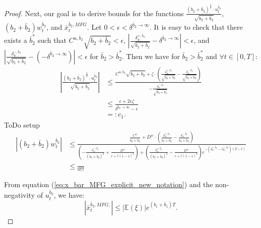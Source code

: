 \documentclass[11pt]{article}
\begin{document}
\begin{proof}
	Next, our goal is to derive bounds for the functions $\frac{(b_2 + \bar{b}_2)^{\frac{3}{2}}\cdot u^{\bar{b}_2}_t}{\sqrt{b_2+\bar{b}_2}}$, $(b_2 + \bar{b}_2) w^{\bar{b}_2}_t$, and $\bar{x}_t^{\bar{b}_2,MFG}$. Let $0<\epsilon<\delta^{\bar{b}_2 \to \infty}$. It is easy to check that there exists a $\bar{b}_2^*$ such that $ C^{u,\bar{b}_2}\sqrt{b_2 + \bar{b}_2} <\epsilon$, $\left| \frac{\delta^{+,\bar{b}_2}_u}{\sqrt{b_2 + \bar{b}_2}}-\delta^{\bar{b}_2 \to \infty}\right|< \epsilon$, and $\left| \frac{\delta^{-,\bar{b}_2}_u}{\sqrt{b_2 + \bar{b}_2}}-(-\delta^{\bar{b}_2 \to \infty})\right|< \epsilon$ for $\bar{b}_2>\bar{b}_2^*$. Then we have for $\bar{b}_2>\bar{b}^*_2$ and $\forall t\in[0,T]$:
		\begin{equation*}
		\begin{split}
		\left| \frac{(b_2 + \bar{b}_2)^{\frac{3}{2}}\cdot u^{\bar{b}_2}_t}{\sqrt{b_2+\bar{b}_2}} \right| &\leq \frac{
			C^{u,\bar{b}_2}\sqrt{b_2 + \bar{b}_2} + \zeta \cdot \left(\frac{\delta^{+,\bar{b}_2}_u}{\sqrt{b_2 + \bar{b}_2}} -\frac{\delta^{-,\bar{b}_2}_u}{\sqrt{b_2 + \bar{b}_2}}\right)}{-\frac{\delta^{-,\bar{b}_2}_u}{\sqrt{b_2 + \bar{b}_2}}}\\
		&\leq \frac{\epsilon + 2\epsilon\zeta}{\delta^{\bar{b}_2 \to \infty}-\epsilon} \\
		&=:c_1.
		\end{split} 
		\end{equation*}
	ToDo setup
	\begin{equation*}
	\begin{split}
		\left| (b_2 + \bar{b}_2) w^{\bar{b}_2}_t \right| &\leq \frac{ \frac{C^{w}}{b_2 + \bar{b}_2} + D^{w}\cdot\left( \frac{\delta^{+,\bar{b}_2}_w}{b_2 + \bar{b}_2}-\frac{\delta^{-,\bar{b}_2}_w}{b_2 + \bar{b}_2} \right)}{ \left(- \frac{\delta^{-,\bar{b}_2}_w}{(b_2 + \bar{b}_2)^2} + \frac{D^{w}}{r + \bar{r}(1-\bar{s})^2} \right) + \left( \frac{\delta^{+,\bar{b}_2}_w}{(b_2 + \bar{b}_2)^2} - \frac{D^{w}}{r + \bar{r}(1-\bar{s})^2} \right)e^{- (\delta^{+,\bar{b}_2}_w - \delta^{-,\bar{b}_2}_w)(T-t)} } \\
		& \leq \frac{}{0!!!}
	\end{split}
	\end{equation*}
	
	From equation (\ref{eq:x_bar_MFG_explicit_new_notation}) and the non-negativity of $u^{\bar{b}_2}_t$, we have:
	\begin{equation*}
		\left| \bar{x}^{\bar{b}_2,MFG,}_t \right| \leq \left|\mathbb{E}(\xi)\right|e^{(b_1+\bar{b}_1)T}.
	\end{equation*}
	

\end{proof}
\end{document}
